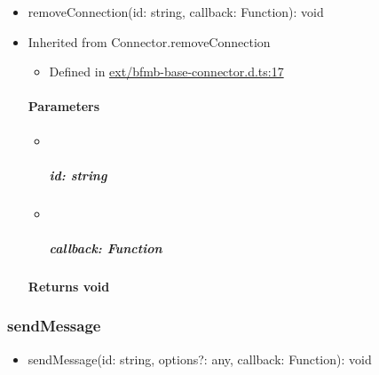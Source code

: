 \documentclass[]{article}
\providecommand{\tightlist}{%
  \setlength{\itemsep}{0pt}\setlength{\parskip}{0pt}}
\let\oldparagraph\paragraph
\renewcommand{\paragraph}[1]{\oldparagraph{#1}\mbox{}}
\let\oldsubparagraph\subparagraph
\renewcommand{\subparagraph}[1]{\oldsubparagraph{#1}\mbox{}}
\begin{document}
\begin{itemize}
\tightlist
\item
  removeConnection{(}id{: }{string}, callback{: }{Function}{)}{: }{void}
\end{itemize}

\begin{itemize}
\item
  Inherited from Connector.removeConnection

  \begin{itemize}
  \tightlist
  \item
    Defined in
    \href{https://github.com/BFMBFramework/TadoConnector/blob/f05932b/src/ext/bfmb-base-connector.d.ts\#L17}{ext/bfmb-base-connector.d.ts:17}
  \end{itemize}

  \hypertarget{parameters-7}{%
  \paragraph{Parameters}\label{parameters-7}}

  \begin{itemize}
  \item ~
    \hypertarget{id-string-4}{%
    \subparagraph{\texorpdfstring{id:
    {string}}{id: string}}\label{id-string-4}}
  \item ~
    \hypertarget{callback-function-5}{%
    \subparagraph{\texorpdfstring{callback:
    {Function}}{callback: Function}}\label{callback-function-5}}
  \end{itemize}

  \hypertarget{returns-void-5}{%
  \paragraph{\texorpdfstring{Returns
  {void}}{Returns void}}\label{returns-void-5}}
\end{itemize}

\protect\hypertarget{sendmessage}{}{}

\hypertarget{sendmessage}{%
\subsubsection{sendMessage}\label{sendmessage}}

\begin{itemize}
\tightlist
\item
  sendMessage{(}id{: }{string}, options{?: }{any}, callback{:
  }{Function}{)}{: }{void}
\end{itemize}
\end{document}
